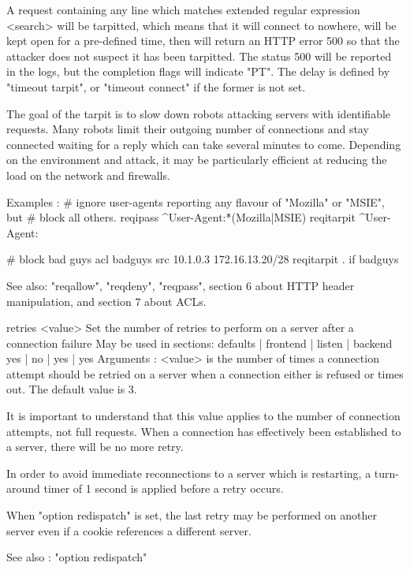   A request containing any line which matches extended regular expression
  <search> will be tarpitted, which means that it will connect to nowhere, will
  be kept open for a pre-defined time, then will return an HTTP error 500 so
  that the attacker does not suspect it has been tarpitted. The status 500 will
  be reported in the logs, but the completion flags will indicate "PT". The
  delay is defined by "timeout tarpit", or "timeout connect" if the former is
  not set.

  The goal of the tarpit is to slow down robots attacking servers with
  identifiable requests. Many robots limit their outgoing number of connections
  and stay connected waiting for a reply which can take several minutes to
  come. Depending on the environment and attack, it may be particularly
  efficient at reducing the load on the network and firewalls.

  Examples :
     # ignore user-agents reporting any flavour of "Mozilla" or "MSIE", but
     # block all others.
     reqipass   ^User-Agent:\.*(Mozilla|MSIE)
     reqitarpit ^User-Agent:

     # block bad guys
     acl badguys src 10.1.0.3 172.16.13.20/28
     reqitarpit . if badguys

  See also: "reqallow", "reqdeny", "reqpass", section 6 about HTTP header
            manipulation, and section 7 about ACLs.


retries <value>
  Set the number of retries to perform on a server after a connection failure
  May be used in sections:    defaults | frontend | listen | backend
                                 yes   |    no    |   yes  |   yes
  Arguments :
    <value>   is the number of times a connection attempt should be retried on
              a server when a connection either is refused or times out. The
              default value is 3.

  It is important to understand that this value applies to the number of
  connection attempts, not full requests. When a connection has effectively
  been established to a server, there will be no more retry.

  In order to avoid immediate reconnections to a server which is restarting,
  a turn-around timer of 1 second is applied before a retry occurs.

  When "option redispatch" is set, the last retry may be performed on another
  server even if a cookie references a different server.

  See also : "option redispatch"


